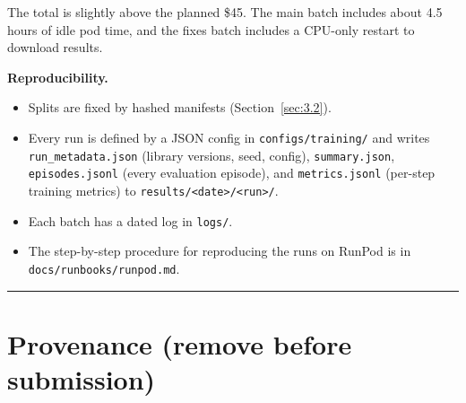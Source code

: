 The total is slightly above the planned \$45. The main batch includes
about 4.5 hours of idle pod time, and the fixes batch includes a
CPU-only restart to download results.

\textbf{Reproducibility.}

\begin{itemize}
\tightlist
\item
  Splits are fixed by hashed manifests (Section~\ref{sec:3.2}).
\item
  Every run is defined by a JSON config in
  \texttt{configs/\allowbreak{}training/\allowbreak{}} and writes
  \texttt{run\_\allowbreak{}metadata.\allowbreak{}json} (library
  versions, seed, config), \texttt{summary.\allowbreak{}json},
  \texttt{episodes.\allowbreak{}jsonl} (every evaluation episode), and
  \texttt{metrics.\allowbreak{}jsonl} (per-step training metrics) to
  \texttt{results/\allowbreak{}<date>/\allowbreak{}<run>/\allowbreak{}}.
\item
  Each batch has a dated log in \texttt{logs/\allowbreak{}}.
\item
  The step-by-step procedure for reproducing the runs on RunPod is in
  \texttt{docs/\allowbreak{}runbooks/\allowbreak{}runpod.\allowbreak{}md}.
\end{itemize}

\begin{center}\rule{0.5\linewidth}{0.5pt}\end{center}

\section{Provenance (remove before
submission)}\label{provenance-remove-before-submission}


